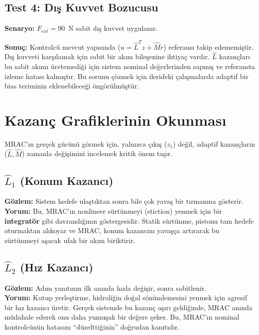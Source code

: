 \documentclass[12pt,a4paper]{article}
\begin{document}
\subsection{Test 4: Dış Kuvvet Bozucusu}

\textbf{Senaryo:} $F_{ext} = 90$~N sabit dış kuvvet uygulanır.

\textbf{Sonuç:} Kontrolcü mevcut yapısında ($u = \hat{L}^T z + \hat{M} r$) referansı takip edememiştir. Dış kuvveti karşılamak için sabit bir akım bileşenine ihtiyaç vardır. $\hat{L}$ kazançları bu sabit akımı üretemediği için sistem nominal değerlerinden sapmış ve referansta izleme hatası kalmıştır. Bu sorunu çözmek için ilerideki çalışmalarda adaptif bir bias teriminin eklenebileceği öngörülmüştür.

\section{Kazanç Grafiklerinin Okunması}
\label{sec:gain_analysis}

MRAC'ın gerçek gücünü görmek için, yalnızca çıkış ($z_1$) değil, adaptif kazançların ($\hat{L}, \hat{M}$) zamanla değişimini incelemek kritik önem taşır.

\subsection{$\hat{L}_1$ (Konum Kazancı)}
\textbf{Gözlem:} Sistem hedefe ulaştıktan sonra bile çok yavaş bir tırmanma gösterir.\\
\textbf{Yorum:} Bu, MRAC'ın nonlineer sürtünmeyi (stiction) yenmek için bir \textbf{integratör} gibi davrandığının göstergesidir. Statik sürtünme, pistonu tam hedefe oturmaktan alıkoyar ve MRAC, konum kazancını yavaşça artırarak bu sürtünmeyi aşacak ufak bir akım biriktirir.

\subsection{$\hat{L}_2$ (Hız Kazancı)}
\textbf{Gözlem:} Adım yanıtının ilk anında hızla değişir, sonra sabitlenir.\\
\textbf{Yorum:} Kutup yerleştirme, hidroliğin doğal sönümlemesini yenmek için agresif bir hız kazancı üretir. Gerçek sistemde bu kazanç aşırı geldiğinde, MRAC anında müdahale ederek onu daha yumuşak bir değere çeker. Bu, MRAC'ın nominal kontrolcünün hatasını ``düzelttiğinin'' doğrudan kanıtıdır.
\end{document}
